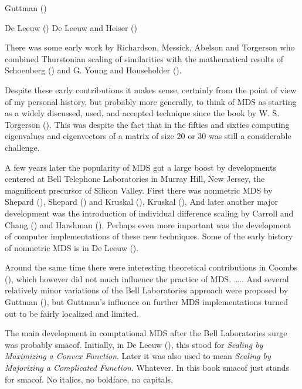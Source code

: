 \documentclass[
  12pt,
  letterpaper,
  DIV=11,
  numbers=noendperiod]{scrreprt}
\theoremstyle{remark}
\begin{document}
Guttman ()

De Leeuw () De Leeuw and Heiser
()

There was some early work by Richardson, Messick, Abelson and Torgerson
who combined Thurstonian scaling of similarities with the mathematical
results of Schoenberg () and G. Young
and Householder ().

Despite these early contributions it makes sense, certainly from the
point of view of my personal history, but probably more generally, to
think of MDS as starting as a widely discussed, used, and accepted
technique since the book by W. S. Torgerson
(). This was despite the fact that in
the fifties and sixties computing eigenvalues and eigenvectors of a
matrix of size 20 or 30 was still a considerable challenge.

A few years later the popularity of MDS got a large boost by
developments centered at Bell Telephone Laboratories in Murray Hill, New
Jersey, the magnificent precursor of Silicon Valley. First there was
nonmetric MDS by Shepard (), Shepard
() and Kruskal
(), Kruskal
(), And later another major development
was the introduction of individual difference scaling by Carroll and
Chang () and Harshman
(). Perhaps even more important was the
development of computer implementations of these new techniques. Some of
the early history of nonmetric MDS is in De Leeuw
().

Around the same time there were interesting theoretical contributions in
Coombs (), which however did not much
influence the practice of MDS. \ldots.. And several relatively minor
variations of the Bell Laboratories approach were proposed by Guttman
(), but Guttman's influence on further
MDS implementations turned out to be fairly localized and limited.

The main development in comptational MDS after the Bell Laboratories
surge was probably smacof. Initially, in De Leeuw
(), this stood for \emph{Scaling by
Maximizing a Convex Function}. Later it was also used to mean
\emph{Scaling by Majorizing a Complicated Function}. Whatever. In this
book smacof just stands for smacof. No italics, no boldface, no
capitals.
\end{document}
